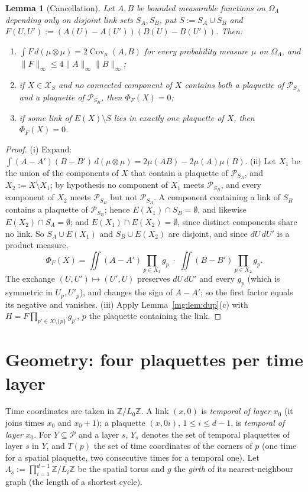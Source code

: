 \documentclass[11pt,a4paper]{article}
\newtheorem{lemma}[theorem]{Lemma}
\theoremstyle{definition}
\theoremstyle{remark}
\DeclareMathOperator{\Cov}{Cov}
\newcommand{\Z}{\mathbb{Z}}
\newcommand{\cP}{\mathcal{P}}
\newcommand{\cX}{\mathcal{X}}
\newcommand{\norm}[1]{\lVert #1\rVert}
\begin{document}
\begin{lemma}[Cancellation]\label{mg:lem:cancel}
Let $A,B$ be bounded measurable functions on $\Omega_\Lambda$ depending only on disjoint link sets $S_A,S_B$, put $S:=S_A\cup S_B$ and
$F(U,U'):=(A(U)-A(U'))(B(U)-B(U'))$. Then:
\begin{enumerate}[label=(\roman*)]
\item $\int F\,d(\mu\otimes\mu)=2\Cov_\mu(A,B)$ for every probability measure $\mu$ on $\Omega_\Lambda$, and $\norm F_\infty\le4\norm A_\infty\norm B_\infty$;
\item if $X\in\cX_S$ and no connected component of $X$ contains both a plaquette of $\cP_{S_A}$ and a plaquette of $\cP_{S_B}$, then
$\Phi_F(X)=0$;
\item if some link of $E(X)\setminus S$ lies in exactly one plaquette of $X$, then $\Phi_F(X)=0$.
\end{enumerate}
\end{lemma}

\begin{proof}
(i) Expand: $\int(A-A')(B-B')\,d(\mu\otimes\mu)=2\mu(AB)-2\mu(A)\mu(B)$.
(ii) Let $X_1$ be the union of the components of $X$ that contain a plaquette of $\cP_{S_A}$, and $X_2:=X\setminus X_1$; by
hypothesis no component of $X_1$ meets $\cP_{S_B}$, and every component of $X_2$ meets $\cP_{S_B}$ but not $\cP_{S_A}$. A component
containing a link of $S_B$ contains a plaquette of $\cP_{S_B}$; hence $E(X_1)\cap S_B=\emptyset$, and likewise
$E(X_2)\cap S_A=\emptyset$; and $E(X_1)\cap E(X_2)=\emptyset$, since distinct components share no link. So $S_A\cup E(X_1)$ and
$S_B\cup E(X_2)$ are disjoint, and since $dU\,dU'$ is a product measure,
\[
\Phi_F(X)=\iint(A-A')\prod_{p\in X_1}g_p\;\cdot\;\iint(B-B')\prod_{p\in X_2}g_p .
\]
The exchange $(U,U')\mapsto(U',U)$ preserves $dU\,dU'$ and every $g_p$ (which is symmetric in $U_p,U'_p$), and changes the sign of
$A-A'$; so the first factor equals its negative and vanishes.
(iii) Apply Lemma~\ref{mg:lem:dup}(c) with $H=F\prod_{p'\in X\setminus\{p\}}g_{p'}$, $p$ the plaquette containing the link.
\end{proof}

\section{Geometry: four plaquettes per time layer}\label{mg:sec:geometry}

Time coordinates are taken in $\Z/L_0\Z$. A link $(x,0)$ is \emph{temporal of layer} $x_0$ (it joins times $x_0$ and $x_0+1$); a
plaquette $(x,0i)$, $1\le i\le d-1$, is \emph{temporal of layer} $x_0$. For $Y\subseteq\cP$ and a layer $s$, $Y_s$ denotes the set of
temporal plaquettes of layer $s$ in $Y$, and $T(p)$ the set of time coordinates of the corners of $p$ (one time for a spatial
plaquette, two consecutive times for a temporal one). Let $\Lambda_s:=\prod_{i=1}^{d-1}\Z/L_i\Z$ be the spatial torus and $g$ the
\emph{girth} of its nearest-neighbour graph (the length of a shortest cycle).
\end{document}
